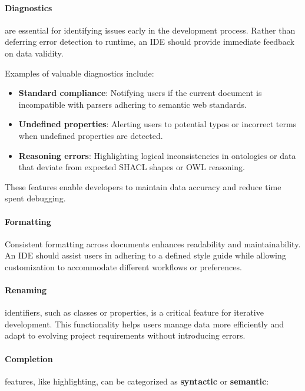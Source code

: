 \paragraph*{Diagnostics} are essential for identifying issues early in the development process. 
Rather than deferring error detection to runtime, an IDE should provide immediate feedback on data validity.

Examples of valuable diagnostics include:
\begin{itemize}
    \item \textbf{Standard compliance}: Notifying users if the current document is incompatible with parsers adhering to semantic web standards.
    \item \textbf{Undefined properties}: Alerting users to potential typos or incorrect terms when undefined properties are detected.
    \item \textbf{Reasoning errors}: Highlighting logical inconsistencies in ontologies or data that deviate from expected SHACL shapes or OWL reasoning.
\end{itemize}

These features enable developers to maintain data accuracy and reduce time spent debugging.


\paragraph*{Formatting}

Consistent formatting across documents enhances readability and maintainability.
An IDE should assist users in adhering to a defined style guide while allowing customization to accommodate different workflows or preferences.

\paragraph*{Renaming} identifiers, such as classes or properties, is a critical feature for iterative development.
This functionality helps users manage data more efficiently and adapt to evolving project requirements without introducing errors.

\paragraph*{Completion} features, like highlighting, can be categorized as \textbf{syntactic} or \textbf{semantic}:

